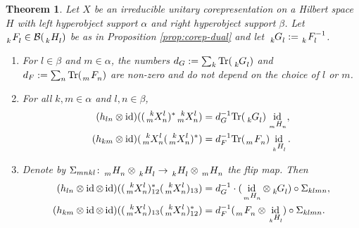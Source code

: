 \documentclass[11pt]{article}
\DeclareMathOperator{\id}{id}
\newcommand{\Tr}{\mathrm{Tr}}
\newcommand{\Gr}[5]{\,\tensor*[^{#2}_{#4}]{#1}{^{#3}_{#5}}}%
\newcommand{\Gru}[3]{\Gr{#1}{}{}{#2}{#3}}
\newcommand{\Grd}[3]{\Gr{#1}{}{}{#2}{#3}}
\newtheorem{Theorem}{Theorem}[section]
\theoremstyle{definition}
\numberwithin{equation}{section}
\begin{document}
\begin{Theorem}
  Let $X$ be an irreducible unitary corepresentation on a Hilbert space $H$ with left hyperobject
  support  $\alpha$ and right hyperobject support $\beta$. Let $\Grd{F}{k}{l}
  \in \mathcal{B}(\Grd{H}{k}{l})$ be as in Proposition \ref{prop:corep-dual} and let
  $\Grd{G}{k}{l}:=\Gr{F}{}{-1}{k}{l}$.
  \begin{enumerate}
  \item For $l \in \beta$ and $m\in\alpha$, the numbers $d_G:=\sum_{k} \Tr (\Grd{G}{k}{l})$ and $d_F:=\sum_{n} \Tr (\Grd{F}{m}{n})$ are non-zero and do not depend on the choice of $l$ or $m$.
    \item  For all $k,m \in \alpha$ and $l,n\in \beta$,
    \begin{align*}
      (h_{ln} \otimes \id)((\Gr{X}{k}{l}{m}{n})^{*}\Gr{X}{k}{l}{m}{n})
      &=d_G^{-1}\Tr(\Gru{G}{k}{l})
      \id_{\Grd{H}{m}{n}}, \\
      (h_{km} \otimes \id)(\Gr{X}{k}{l}{m}{n}(\Gr{X}{k}{l}{m}{n})^{*})
      &=d_F^{-1}\Tr(\Grd{F}{m}{n})
      \id_{\Grd{H}{k}{l}}.
    \end{align*}
  \item    Denote by $\Sigma_{mnkl} \colon \Grd{H}{m}{n}\otimes \Grd{H}{k}{l} \to \Grd{H}{k}{l}\otimes
  \Grd{H}{m}{n}$ the flip map. Then
    \begin{align*}
      (h_{ln} \otimes \id \otimes
    \id)((\Gr{X}{k}{l}{m}{n})^{*}_{12}(\Gr{X}{k}{l}{m}{n})_{13})  &=  d_{G}^{-1}\cdot
    (\id_{\Grd{H}{m}{n}} \otimes \Grd{G}{k}{l}) \circ \Sigma_{klmn}, \\
   (h_{km} \otimes \id \otimes
   \id)((\Gr{X}{k}{l}{m}{n})_{13}(\Gr{X}{k}{l}{m}{n})^{*}_{12}) &= d_F^{-1} (\Grd{F}{m}{n}
   \otimes \id_{\Grd{H}{k}{l}}) \circ \Sigma_{klmn}.
    \end{align*}
  \end{enumerate}
\end{Theorem}
\end{document}
